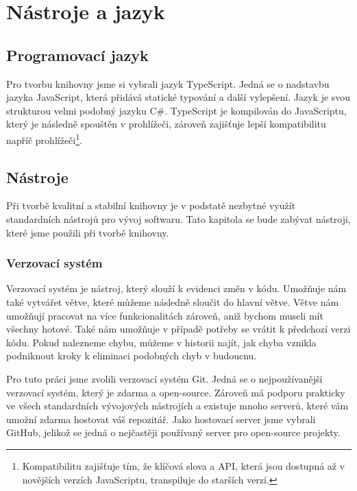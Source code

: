 \chapter{Nástroje a jazyk}
\label{chap:technologies}

\section{Programovací jazyk}
\label{sec:programming-language}

Pro tvorbu knihovny jsme si vybrali jazyk TypeScript\cite{geometryjs:wiki:technologies}. 
Jedná se o nadstavbu jazyka JavaScript, která přidává statické typování a další vylepšení\cite{TypeScript:handbook}. 
Jazyk je svou strukturou velmi podobný jazyku C\#.
TypeScript je kompilován do JavaScriptu\cite{TypeScript}, který je následně spouštěn v prohlížeči, zároveň zajišťuje lepší kompatibilitu napříč prohlížeči\footnote{Kompatibilitu zajišťuje tím, že klíčová slova a API, která jsou dostupná až v novějších verzích JavaScriptu, transpiluje do starších verzí.}\cite{TypeScript:tsconfig}.

\section{Nástroje}
\label{sec:tools}

Při tvorbě kvalitní a stabilní knihovny je v podstatě nezbytné využít standardních nástrojů pro vývoj softwaru. 
Tato kapitola se bude zabývat nástroji, které jsme použili při tvorbě knihovny.

\subsection{Verzovací systém}
\label{subsec:version-control}

Verzovací systém je nástroj, který slouží k evidenci změn v kódu. 
Umožňuje nám také vytvářet větve, které můžeme následně sloučit do hlavní větve\cite{Git:branches,wikipedia:version-control}. 
Větve nám umožňují pracovat na více funkcionalitách zároveň, aniž bychom museli mít všechny hotové. 
Také nám umožňuje v případě potřeby se vrátit k předchozí verzi kódu.
 Pokud nalezneme chybu, můžeme v historii najít, jak chyba vznikla podniknout kroky k eliminaci podobných chyb v budoucnu.

Pro tuto práci jsme zvolili verzovací systém Git. Jedná se o nejpoužívanější verzovací systém, který je zdarma a open-source\cite{Git,geometryjs:wiki:technologies}.
Zároveň má podporu prakticky ve všech standardních vývojových nástrojích a existuje mnoho serverů, které vám umožní zdarma hostovat váš repozitář.
Jako hostovací server jsme vybrali GitHub, jelikož se jedná o nejčastěji používaný server pro open-source projekty\cite{GitHub:about}.

